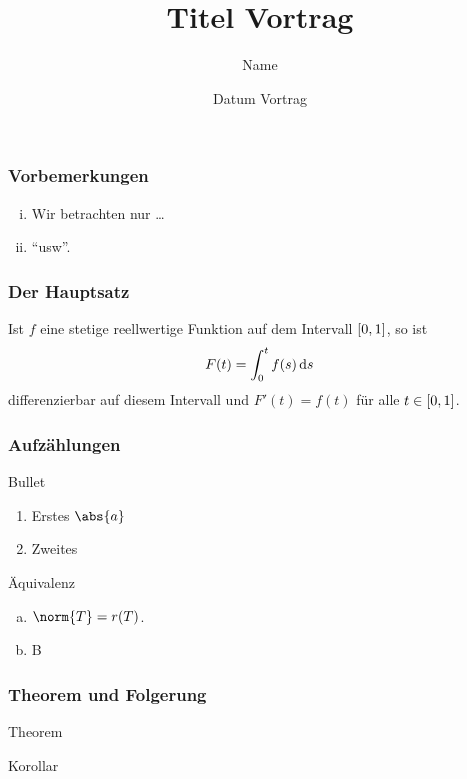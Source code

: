 \documentclass[ngerman]{beamer}
\begin{document}
%
\title{Titel Vortrag}
\author{Name}
\date{Datum Vortrag} 
\frame{\titlepage} %
\begin{frame} 		
	\frametitle{Vorbemerkungen}
	
	\begin{enumerate}[(i)]
		\item 
		Wir betrachten nur \ldots
		
		\item
		\enquote{usw}.
	\end{enumerate}
\end{frame}
\begin{frame}
	\frametitle{Der Hauptsatz}

\begin{theorem}\label{prop:hauptsatz}
%	
Ist $ f $ eine stetige reellwertige Funktion auf dem Intervall $ \left[ 0,1 \right] $, so ist
%
\[
  	F( t ) = \int_{ 0 }^{ t } f(s) \mathop{}\!\mathrm{d}{s}
\]
%
differenzierbar auf diesem Intervall und $ F'(t) = f(t) $ für alle $ t \in \left[ 0,1 \right] $.
\end{theorem}


\end{frame}
\begin{frame}
	\frametitle{Aufzählungen}
%
\begin{block}{Bullet}
	\begin{enumerate}[$\circ$]

		\item 
		Erstes $ \abs{a} $
		
		\item
		Zweites
		
	\end{enumerate}
%
\end{block}	

\begin{block}{Äquivalenz}
	\begin{enumerate}[(a)]
		\item 
		$ \norm{ T } = r(T) $.
		
		\item
		B
	\end{enumerate}
\end{block}
%
\end{frame}
\begin{frame}
	\frametitle{Theorem und Folgerung}
	
	\begin{theorem}
		Theorem
	\end{theorem}
	
	\begin{corollary}
		Korollar
	\end{corollary}
\end{frame}
\end{document}
